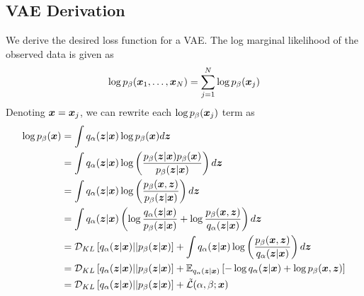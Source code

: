 \subsection{VAE Derivation}\label{sec:vae_derive}

We derive the desired loss function for a VAE. The log marginal likelihood of the observed data is given as
\begin{equation}
  \log p_{\beta}(\boldsymbol{x}_1,\ldots,\boldsymbol{x}_N) = \sum_{j=1}^N \log p_{\beta}(\boldsymbol{x}_j)
  \label{eq:vae_marginal}
\end{equation}
Denoting $\boldsymbol{x} = \boldsymbol{x}_j$, we can rewrite each $\log p_{\beta}(\boldsymbol{x}_j)$ term as 
\begin{equation}
  \begin{split}
    \log p_{\beta}(\boldsymbol{x}) &= \int q_\alpha(\boldsymbol{z} |\boldsymbol{x}) \log p_{\beta} (\boldsymbol{x})d\boldsymbol{z} \\
    &= \int q_\alpha(\boldsymbol{z} | \boldsymbol{x}) \log \left( \frac{p_{\beta}(\boldsymbol{z} | \boldsymbol{x}) p_{\beta}(\boldsymbol{x})}{p_{\beta}(\boldsymbol{z} | \boldsymbol{x})} \right) d\boldsymbol{z}  \\
    &= \int q_\alpha(\boldsymbol{z} | \boldsymbol{x}) \log \left( \frac{p_{\beta}(\boldsymbol{x}, \boldsymbol{z})}{p_{\beta}(\boldsymbol{z} | \boldsymbol{x})} \right) d\boldsymbol{z}\\
    &= \int q_\alpha(\boldsymbol{z} | \boldsymbol{x}) \left( \log \frac{q_\alpha(\boldsymbol{z} | \boldsymbol{x})}{p_{\beta}(\boldsymbol{z} | \boldsymbol{x})} + \log \frac{p_{\beta}(\boldsymbol{x}, \boldsymbol{z})}{q_\alpha(\boldsymbol{z} | \boldsymbol{x})}\right) d\boldsymbol{z} \\
    &= \mathcal{D}_{KL}\left[ q_\alpha(\boldsymbol{z} |\boldsymbol{x}) || p_{\beta}(\boldsymbol{z} | \boldsymbol{x}) \right] + \int q_\alpha(\boldsymbol{z} | \boldsymbol{x}) \log \left( \frac{p_{\beta}(\boldsymbol{x}, \boldsymbol{z})}{q_\alpha(\boldsymbol{z} | \boldsymbol{x})} \right)d\boldsymbol{z} \\
    &= \mathcal{D}_{KL}\left[ q_\alpha(\boldsymbol{z} |\boldsymbol{x}) || p_{\beta}(\boldsymbol{z} | \boldsymbol{x}) \right] + \mathbb{E}_{q_\alpha(\boldsymbol{z} | \boldsymbol{x})}\left[ -\log q_\alpha(\boldsymbol{z} | \boldsymbol{x}) + \log p_{\beta}(\boldsymbol{x}, \boldsymbol{z}) \right] \\
    &= \mathcal{D}_{KL}\left[ q_\alpha(\boldsymbol{z} |\boldsymbol{x}) || p_{\beta}(\boldsymbol{z} | \boldsymbol{x}) \right] + \tilde{\mathcal{L}}(\alpha, \beta; \boldsymbol{x})
\label{eq:vae_derive}
  \end{split}
\end{equation}

